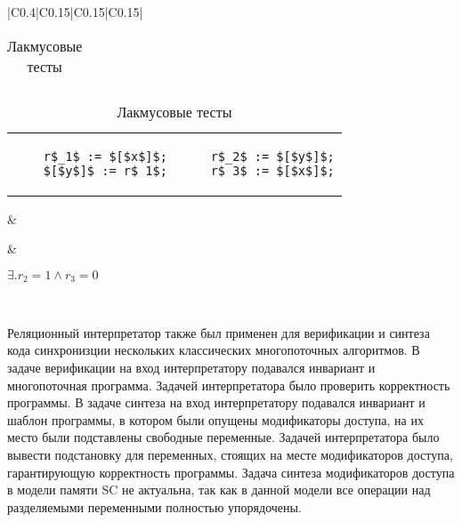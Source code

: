 \begin{table}
\begin{tabular}{|C{0.4\textwidth}|C{0.15\textwidth}|C{0.15\textwidth}|C{0.15\textwidth}|}
\begin{tabular}{@{\hskip -15pt}l @{\hskip 5pt} @{\hskip -15pt}l}
    \end{tabular}
    
    \vspace{5pt}
    
    \begin{tabular}{@{\hskip -15pt}l|@{\hskip 5pt}|@{\hskip -15pt}l}
    \begin{lstlisting}
    r$_1$ := $[$x$]$;
    $[$y$]$ := r$_1$;
    \end{lstlisting}
    &
    \begin{lstlisting}
    r$_2$ := $[$y$]$;
    r$_3$ := $[$x$]$;
    \end{lstlisting}
    \end{tabular}  
    
    &
    
    
    &
    
    $\exists. r_2 = 1 \wedge r_3 = 0 $
    
    \\ \hline
    
    \end{tabular}
    \egroup
    
\caption{Лакмусовые тесты }
\label{tab:litmus2}
\end{table}

Реляционный интерпретатор также был применен для верификации 
и синтеза кода синхронизции нескольких классических многопоточных алгоритмов.
В задаче верификации на вход интерпретатору подавался инвариант и многопоточная программа.
Задачей интерпретатора было проверить корректность программы. 
В задаче синтеза на вход интерпретатору подавался инвариант и шаблон программы,
в котором были опущены модификаторы доступа, 
на их место были подставлены свободные переменные.
Задачей интерпретатора было вывести подстановку для переменных,
стоящих на месте модификаторов доступа, 
гарантирующую корректность программы.
Задача синтеза модификаторов доступа в модели памяти SC не актуальна,
так как в данной модели все операции над разделяемыми переменными полностью упорядочены.


